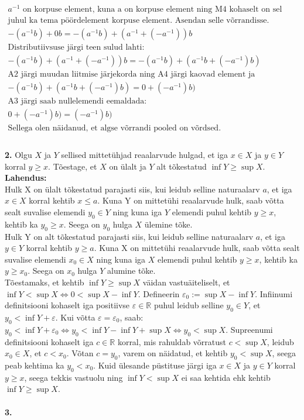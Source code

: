 \documentclass{article}
\begin{document}
\begin{equation*}
\begin{aligned}
a^{-1}\text{ on korpuse element, kuna a on korpuse element ning M4 kohaselt on sel}\\
\text{juhul ka tema p\"o\"ordelement korpuse element. Asendan selle v\~orrandisse.}\\
-(a^{-1}b)+0b=-(a^{-1}b)+(a^{-1}+(-a^{-1}))b\\
\text{Distributiivsuse j\"argi teen sulud lahti:}\\
-(a^{-1}b)+(a^{-1}+(-a^{-1}))b=-(a^{-1}b)+(a^{-1}b+(-a^{-1})b)\\
\text{A2 j\"argi muudan liitmise j\"arjekorda ning A4 j\"argi kaovad element ja vastandelement}\\
-(a^{-1}b)+(a^{-1}b+(-a^{-1})b)=0+(-a^{-1})b)\\
\text{A3 j\"argi saab nullelemendi eemaldada:}\\
0+(-a^{-1})b)=(-a^{-1})b)\\
\text{Sellega olen n\"aidanud, et algse v\~orrandi pooled on v\~ordsed.}\\
\end{aligned}
\end{equation*}
\pagebreak\\
\textbf{2.} Olgu $X$ ja $Y$ sellised mittet\"uhjad reaalarvude hulgad, et iga $x\in X$ ja $y\in Y$ korral $y\geq x$. T\~oestage, et $X$ on \"ulalt ja $Y$ alt t\~okestatud $\inf Y \geq \sup X$.\\
\textbf{Lahendus:}\\
Hulk X on \"ulalt t\~okestatud parajasti siis, kui leidub selline naturaalarv $a$, et iga $x\in X$ korral kehtib $x\leq a$. Kuna Y on mittet\"uhi reaalarvude hulk, saab v\~otta sealt suvalise elemendi $y_0\in Y$ ning kuna iga $Y$ elemendi puhul kehtib $y\geq x$, kehtib ka $y_0\geq x$. Seega on $y_0$ hulga $X$ \"ulemine t\~oke.\\
Hulk Y on alt t\~okestatud parajasti siis, kui leidub selline naturaalarv $a$, et iga $y\in Y$ korral kehtib $y\geq a$. Kuna X on mittet\"uhi reaalarvude hulk, saab v\~otta sealt suvalise elemendi $x_0\in X$ ning kuna iga $X$ elemendi puhul kehtib $y\geq x$, kehtib ka $y\geq x_0$. Seega on $x_0$ hulga $Y$ alumine t\~oke.\\
T\~oestamaks, et kehtib $\inf Y \geq \sup X$ v\"aidan vastu\"aiteliselt, et $\inf Y < \sup X\Leftrightarrow 0 < \sup X-\inf Y$. Defineerin $\varepsilon_0 :=\sup X-\inf Y$. Infiinumi definitsiooni kohaselt iga positiivse $\varepsilon\in\mathbb{R}$ puhul leidub selline $y_0\in Y$, et $y_0<\inf Y +\varepsilon$. Kui v\~otta $\varepsilon=\varepsilon_0$, saab: $y_0<\inf Y +\varepsilon_0\Leftrightarrow y_0<\inf Y -\inf Y+\sup X\Leftrightarrow y_0<\sup X$. Supreenumi definitsiooni kohaselt iga $c\in\mathbb{R}$ korral, mis rahuldab v\~orratust $c<\sup X$, leidub $x_0\in X$, et $c<x_0$. V\~otan $c=y_0$, varem on n\"aidatud, et kehtib $y_0<\sup X$, seega peab kehtima ka $y_0<x_0$. Kuid \"ulesande p\"ustituse j\"argi iga $x\in X$ ja $y\in Y$ korral $y\geq x$, seega tekkis vastuolu ning $\inf Y < \sup X$ ei saa kehtida ehk kehtib $\inf Y \geq \sup X$.\\\\
\textbf{3.}
\end{document}
